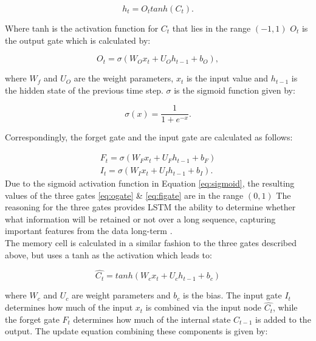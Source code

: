 \begin{equation}
    h_{t} = O_{t}tanh(C_{t}).
\end{equation}

Where tanh is the activation function for $C_{t}$ that lies in the range $(-1,1)$ $O_{t}$ is the output gate which is calculated by:

\begin{equation}\label{eq:ogate}
    O_{t} = \sigma(W_{O}x_{t} + U_{O}h_{t-1} + b_{O}),
\end{equation}

where $W_{f}$ and $U_{O}$ are the weight parameters, $x_{t}$ is the input value and $h_{t-1}$ is the hidden state of the previous time step. $\sigma$ is the sigmoid function given by:

\begin{equation}\label{eq:sigmoid}
    \sigma(x) = \frac{1}{1+e^{-x}}.
\end{equation}

Correspondingly, the forget gate and the input gate are calculated as follows:

\begin{equation}\label{eq:figate}
    \begin{aligned}
    F_{t} = \sigma(W_{F}x_{t} + U_{F}h_{t-1} + b_{F}) \\
    I_{t} = \sigma(W_{I}x_{t} + U_{I}h_{t-1} + b_{I}).
    \end{aligned}
\end{equation}
Due to the sigmoid activation function in Equation \ref{eq:sigmoid}, the resulting values of the three gates \ref{eq:ogate} \& \ref{eq:figate} are in the range $(0,1)$
The reasoning for the three gates provides LSTM the ability to determine whether what information will be retained or not over a long sequence, capturing important features from the data long-term \cite{diveLSTM}.\\
The memory cell is calculated in a similar fashion to the three gates described above, but uses a tanh as the activation which leads to:

\begin{equation}
    \hat{C_{t}} = tanh(W_{c}x_{t} + U_{c}h_{t-1} + b_{c})
\end{equation}

where $W_{c}$ and $U_{c}$ are weight parameters and $b_{c}$ is the bias. The input gate $I_{t}$ determines how much of the input $x_{t}$ is combined via the input node $\hat{C_{t}}$, while the forget gate $F_{t}$ determines how much of the internal state $C_{t-1}$ is added to the output. The update equation combining these components is given by:


